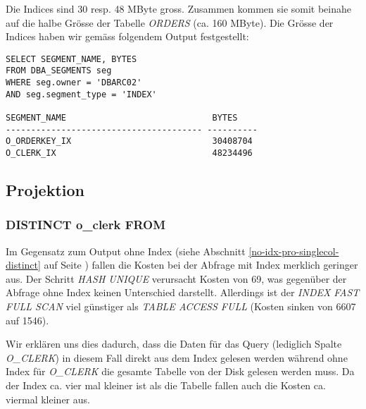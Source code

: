\documentclass[11pt,a4paper,parskip=half]{scrartcl}
\begin{document}
Die Indices sind 30 resp. 48 MByte gross. Zusammen kommen sie somit beinahe auf die halbe Grösse der Tabelle \emph{ORDERS} (ca. 160 MByte). Die Grösse der Indices haben wir gemäss folgendem Output festgestellt:
\begin{lstlisting}
SELECT SEGMENT_NAME, BYTES
FROM DBA_SEGMENTS seg
WHERE seg.owner = 'DBARC02'
AND seg.segment_type = 'INDEX'

SEGMENT_NAME                             BYTES
--------------------------------------- ----------
O_ORDERKEY_IX                            30408704 
O_CLERK_IX                               48234496 
\end{lstlisting}

\subsection{Projektion}
\subsubsection{DISTINCT o\_clerk FROM}
Im Gegensatz zum Output ohne Index (siehe Abschnitt \ref{no-idx-pro-singlecol-distinct} auf Seite \pageref{no-idx-pro-singlecol-distinct}) fallen die Kosten bei der Abfrage mit Index merklich geringer aus. Der Schritt \emph{HASH UNIQUE} verursacht Kosten von 69, was gegenüber der Abfrage ohne Index keinen Unterschied darstellt. Allerdings ist der \emph{INDEX FAST FULL SCAN} viel günstiger als \emph{TABLE ACCESS FULL} (Kosten sinken von 6607 auf 1546).

Wir erklären uns dies dadurch, dass die Daten für das Query (lediglich Spalte \emph{O\_CLERK}) in diesem Fall direkt aus dem Index gelesen werden während ohne Index für \emph{O\_CLERK} die gesamte Tabelle von der Disk gelesen werden muss. Da der Index ca. vier mal kleiner ist als die Tabelle fallen auch die Kosten ca. viermal kleiner aus.
\end{document}

